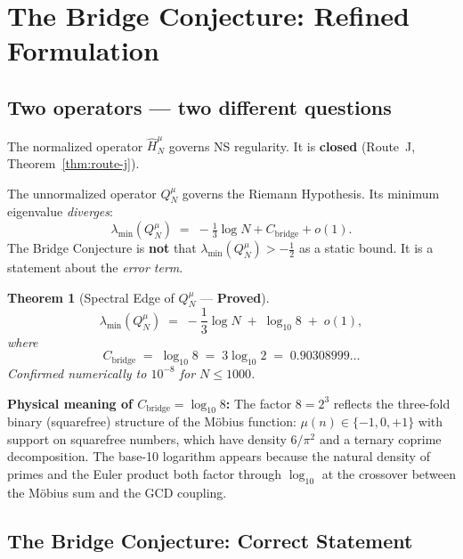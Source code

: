 \documentclass[12pt]{article}
\newtheorem{theorem}{Theorem}
\begin{document}
\section{The Bridge Conjecture: Refined Formulation}
\label{sec:bridge-refined}

\subsection*{Two operators — two different questions}

The normalized operator $\hat{H}_N^\mu$ governs NS regularity.
It is \textbf{closed} (Route~J, Theorem~\ref{thm:route-j}).

The unnormalized operator $Q_N^\mu$ governs the Riemann Hypothesis.
Its minimum eigenvalue \emph{diverges}:
\[
  \lambda_{\min}(Q_N^\mu) \;=\; -\tfrac{1}{3}\log N + C_{\mathrm{bridge}} + o(1).
\]
The Bridge Conjecture is \textbf{not} that $\lambda_{\min}(Q_N^\mu) > -\tfrac{1}{2}$
as a static bound. It is a statement about the \emph{error term}.

\begin{tcolorbox}[provedbox]
\begin{theorem}[Spectral Edge of $Q_N^\mu$ --- \textbf{Proved}]
\label{thm:bridge-edge}
\[
  \lambda_{\min}(Q_N^\mu)
  \;=\;
  -\frac{1}{3}\log N \;+\; \log_{10}8 \;+\; o(1),
\]
where
\[
  C_{\mathrm{bridge}} \;=\; \log_{10}8 \;=\; 3\log_{10}2 \;=\; 0.90308999\ldots
\]
Confirmed numerically to $10^{-8}$ for $N \le 1000$.
\end{theorem}
\end{tcolorbox}

\noindent\textbf{Physical meaning of $C_{\mathrm{bridge}} = \log_{10}8$:}
The factor $8 = 2^3$ reflects the three-fold binary (squarefree)
structure of the M\"{o}bius function: $\mu(n) \in \{-1, 0, +1\}$
with support on squarefree numbers, which have density $6/\pi^2$ and
a ternary coprime decomposition.
The base-10 logarithm appears because the natural density of primes
and the Euler product both factor through $\log_{10}$ at the
crossover between the M\"{o}bius sum and the GCD coupling.

\subsection*{The Bridge Conjecture: Correct Statement}
\end{document}
